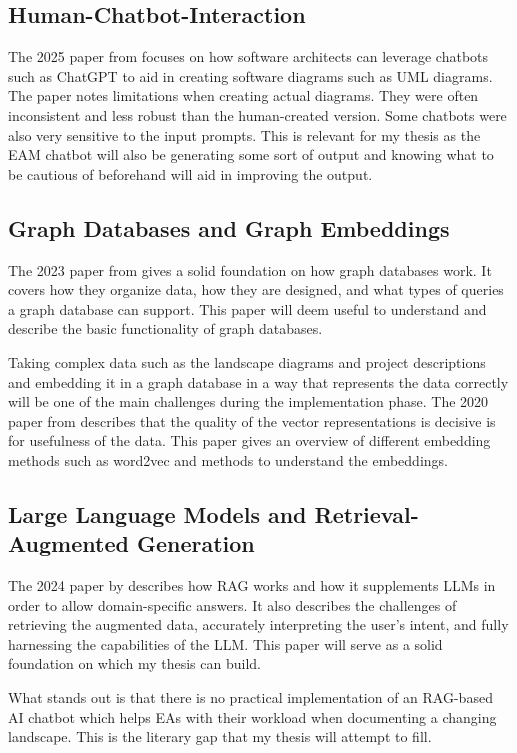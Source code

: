 \documentclass[english]{lni}
\begin{document}
\subsection{Human-Chatbot-Interaction}
The 2025 paper from \cite{ramachandran2025transforming} focuses on how software architects can leverage chatbots such as ChatGPT to aid in creating software diagrams such as UML diagrams. The paper notes limitations when creating actual diagrams. They were often inconsistent and less robust than the human-created version. Some chatbots were also very sensitive to the input prompts. This is relevant for my thesis as the EAM chatbot will also be generating some sort of output and knowing what to be cautious of beforehand will aid in improving the output.

\subsection{Graph Databases and Graph Embeddings}
The 2023 paper from \cite{besta2023demystifying} gives a solid foundation on how graph databases work. It covers how they organize data, how they are designed, and what types of queries a graph database can support. This paper will deem useful to understand and describe the basic functionality of graph databases.

Taking complex data such as the landscape diagrams and project descriptions and embedding it in a graph database in a way that represents the data correctly will be one of the main challenges during the implementation phase. The 2020 paper from \cite{grohe2020word2vec} describes that the quality of the vector representations is decisive is for usefulness of the data. This paper gives an overview of different embedding methods such as word2vec and methods to understand the embeddings.

\subsection{Large Language Models and Retrieval-Augmented Generation}
The 2024 paper by \cite{zhao2024retrieval} describes how RAG works and how it supplements LLMs in order to allow domain-specific answers. It also describes the challenges of retrieving the augmented data, accurately interpreting the user's intent, and fully harnessing the capabilities of the LLM. This paper will serve as a solid foundation on which my thesis can build.

What stands out is that there is no practical implementation of an RAG-based AI chatbot which helps EAs with their workload when documenting a changing landscape. This is the literary gap that my thesis will attempt to fill.
\end{document}
